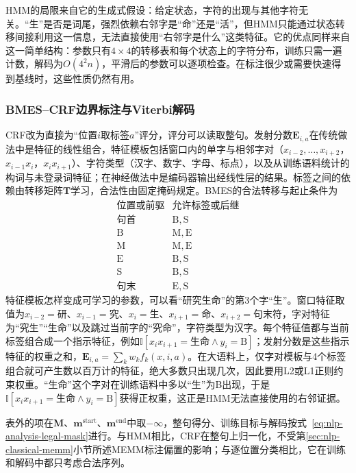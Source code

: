 HMM的局限来自它的生成式假设：给定状态，字符的出现与其他字符无关。“生”是否是词尾，强烈依赖右邻字是“命”还是“活”，但HMM只能通过状态转移间接利用这一信息，无法直接使用“右邻字是什么”这类特征。它的优点同样来自这一简单结构：参数只有$4\times4$的转移表和每个状态上的字符分布，训练只需一遍计数，解码为$O(4^2n)$，平滑后的参数可以逐项检查。在标注很少或需要快速得到基线时，这些性质仍然有用。

\subsubsection{BMES--CRF边界标注与Viterbi解码}
\label{sec:nlp-analysis-bmes-crf}

CRF改为直接为“位置$i$取标签$a$”评分，评分可以读取整句。发射分数$\bm E_{i,a}$在传统做法中是特征的线性组合，特征模板包括窗口内的单字与相邻字对（$x_{i-2},\ldots,x_{i+2}$，$x_{i-1}x_i$，$x_ix_{i+1}$）、字符类型（汉字、数字、字母、标点），以及从训练语料统计的构词与未登录词特征；在神经做法中是编码器输出经线性层的结果。标签之间的依赖由转移矩阵$\bm T$学习，合法性由固定掩码规定。BMES的合法转移与起止条件为
\[
\begin{array}{c|c}
 \text{位置或前驱}&\text{允许标签或后继}\\ \hline
 \text{句首}&\mathrm{B,S}\\
 \mathrm{B}&\mathrm{M,E}\\
 \mathrm{M}&\mathrm{M,E}\\
 \mathrm{E}&\mathrm{B,S}\\
 \mathrm{S}&\mathrm{B,S}\\
 \text{句末}&\mathrm{E,S}
\end{array}
\]
特征模板怎样变成可学习的参数，可以看“研究生命”的第3个字“生”。窗口特征取值为$x_{i-2}=$研、$x_{i-1}=$究、$x_i=$生、$x_{i+1}=$命、$x_{i+2}=$句末符，字对特征为“究生”“生命”以及跳过当前字的“究命”，字符类型为汉字。每个特征值都与当前标签组合成一个指示特征，例如$\mathbb I[x_ix_{i+1}=\text{生命}\wedge y_i=\mathrm B]$；发射分数是这些指示特征的权重之和，$\bm E_{i,a}=\sum_k w_k f_k(x,i,a)$。在大语料上，仅字对模板与4个标签组合就可产生数以百万计的特征，绝大多数只出现几次，因此要用L2或L1正则约束权重。“生命”这个字对在训练语料中多以“生”为B出现，于是$\mathbb I[x_ix_{i+1}=\text{生命}\wedge y_i=\mathrm B]$获得正权重，这正是HMM无法直接使用的右邻证据。

表外的项在$\bm M$、$\bm m^{\mathrm{start}}$、$\bm m^{\mathrm{end}}$中取$-\infty$，整句得分、训练目标与解码按式~\eqref{eq:nlp-analysis-legal-mask}进行。与HMM相比，CRF在整句上归一化，不受第\ref{sec:nlp-classical-memm}小节所述MEMM标注偏置的影响；与逐位置分类相比，它在训练和解码中都只考虑合法序列。

